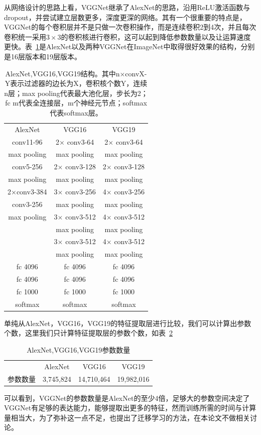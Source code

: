 从网络设计的思路上看，VGGNet继承了AlexNet的思路，沿用ReLU激活函数与dropout，并尝试建立层数更多，深度更深的网络。其有一个很重要的特点是，VGGNet的每个卷积层并不是只做一次卷积操作，而是连续卷积2到4次，并且每次卷积统一采用$3\times3$的卷积核进行卷积，这可以起到降低参数数量以及让运算速度更快。表~\ref{fig:cnn5}是AlexNet以及两种VGGNet在ImageNet中取得很好效果的结构，分别是16层版本和19层版本。
\begin{table}[htb]
\centering
\caption{AlexNet,VGG16,VGG19结构。其中n$\times$convX-Y表示过滤器的边长为X，卷积核个数Y，连续n层；max pooling代表最大池化层，步长为2；fc m代表全连接层，m个神经元节点；softmax代表softmax层。}
\begin{tabular}{ccc}
\toprule[2pt]
AlexNet & VGG16 & VGG19 \\ 
conv11-96 & 2$\times$ conv3-64 & 2$\times$ conv3-64 \\  
max pooling & max pooling & max pooling \\  
conv5-256 & 2$\times$ conv3-128 & 2$\times$ conv3-128 \\  
max pooling & max pooling & max pooling \\  
2$\times$conv3-384 & 3$\times$ conv3-256 & 4$\times$ conv3-256 \\  
conv3-256 & max pooling & max pooling \\ 
max pooling & 3$\times$ conv3-512 & 4$\times$ conv3-512 \\  
\ & max pooling & max pooling \\ 
\ & 3$\times$ conv3-512 & 4$\times$ conv3-512 \\  
\ & max pooling & max pooling  \\  
fc 4096 & fc 4096 & fc 4096 \\ 
fc 4096 & fc 4096 & fc 4096 \\ 
fc 1000 & fc 1000 & fc 1000 \\ 
softmax & softmax & softmax \\ 
\bottomrule[2pt]
\end{tabular} 
\label{fig:cnn5}
\end{table}


单纯从AlexNet，VGG16，VGG19的特征提取层进行比较，我们可以计算出参数个数，这里我们只计算特征提取层的参数个数，如表~\ref{fig:cnn6}
\begin{table}[htb]
\centering
\caption{AlexNet,VGG16,VGG19参数数量}
\begin{tabular}{cccc}
\toprule[2pt]
\ & AlexNet & VGG16 & VGG19 \\ 
参数数量 & 3,745,824 & 14,710,464 & 19,982,016 \\ 
\bottomrule[2pt]
\end{tabular} 
\label{fig:cnn6}
\end{table}
可以看到，VGGNet的参数数量是AlexNet的至少4倍，足够大的参数空间决定了VGGNet有足够的表达能力，能够提取出更多的特征，然而训练所需的时间与计算量相当大，为了弥补这一点不足，也提出了迁移学习的方法，在本论文不做相关讨论。

